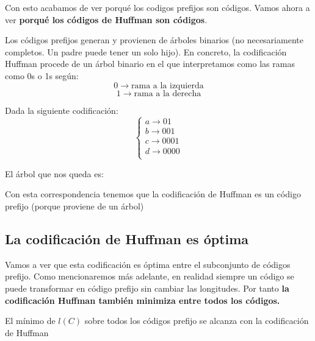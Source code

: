 Con esto acabamos de ver porqué los codigos prefijos son códigos. Vamos ahora a ver \textbf{porqué los códigos de Huffman son códigos}.

Los códigos prefijos generan y provienen de árboles binarios (no necesariamente completos. Un padre puede tener un solo hijo). En concreto, la codificación Huffman procede de un árbol binario en el que interpretamos como las ramas como 0s o 1s según:
$$0 \rightarrow \text{rama a la izquierda}$$
$$1 \rightarrow \text{rama a la derecha}$$

\begin{example}
Dada la siguiente codificación:
\[\begin{cases}
a \rightarrow 01\\ b \rightarrow 001\\ c \rightarrow 0001\\ d \rightarrow 0000\\
\end{cases}\]

El árbol que nos queda es:


\end{example}
Con esta correspondencia tenemos que la codificación de Huffman es un código prefijo (porque proviene de un árbol)

\subsection{La codificación de Huffman es óptima}
Vamos a ver que esta codificación es óptima entre el subconjunto de códigos prefijo. Como mencionaremos más adelante, en realidad siempre un código se puede transformar en código prefijo sin cambiar las longitudes. Por tanto \textbf{la codificación Huffman también minimiza entre todos los códigos.}

\begin{theorem}
	El mínimo de $l(C)$ sobre todos los códigos prefijo se alcanza con la codificación de Huffman
\end{theorem}

